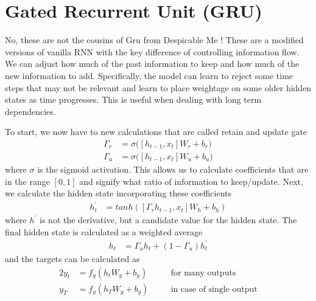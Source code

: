 \documentclass[../../deep_learning_notes.tex]{subfiles}
\begin{document}
\section{Gated Recurrent Unit (GRU)}
No, these are not the cousins of Gru from Despicable Me ! These are a modified versions of vanilla RNN with the key difference of controlling information flow. We can adjust how much of the past information to keep and how much of the new information to add. Specifically, the model can learn to reject some time steps that may not be relevant and learn to place weightage on some older hidden states as time progresses. This is useful when dealing with long term dependencies.\newline

To start, we now have to new calculations that are called retain and update gate
\begin{align*}
    \Gamma_{r} &= \sigma \bigg( [h_{t-1}, x_{t}]W_{r} + b_{r} \bigg)\\
    \Gamma_{u} &= \sigma \bigg( [h_{t-1}, x_{t}]W_{u} + b_{u} \bigg)
\end{align*}
where $\sigma$ is the sigmoid activation. This allows us to calculate coefficients that are in the range $[0,1]$ and signify what ratio of information to keep/update. Next, we calculate the hidden state incorporating these coefficients
\begin{align*}
    h_{t}^{\prime} &= tanh([\Gamma_{r} h_{t-1}, x_{t}]W_{h} + b_{h})
\end{align*}
where $h^{\prime}$ is not the derivative, but a candidate value for the hidden state. The final hidden state is calculated as a weighted average
\begin{align*}
    h_{t} &= \Gamma_{u}h_{t} + (1 - \Gamma_{u})h_{t}^{\prime}
\end{align*}
and the targets can be calculated as
\begin{alignat*}{2}
    y_{t} &= f_{y}(h_{t}W_{y} + b_{y}) \quad &&\mbox{for many outputs}\\
    y_{T} &= f_{y}(h_{T}W_{y} + b_{y}) \quad &&\mbox{in case of single output}
\end{alignat*}
\end{document}
